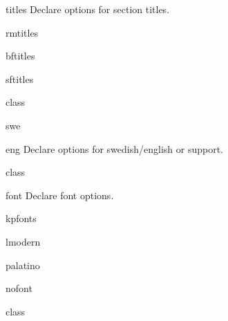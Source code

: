 \documentclass{skdoc}
\begin{document}
	\begin{option}{titles}
	Declare options for section titles.
	\begin{option}{rmtitles}
	\begin{option}{bftitles}
	\begin{option}{sftitles}
\begin{MacroCode}{class}
\newcommand*{\skrapport@SetupTitles}{\expandafter\@skrapport@SetupTitles\expandafter{\CurrentOption}}
\newcommand*{\@skrapport@SetupTitles}[1]{%
	\IfStrEq{#1}{bftitles}{%
		\setkeys{skrapport}{titles={bf}}%
	}{\IfStrEq{#1}{sftitles}{%
		\setkeys{skrapport}{titles={sf}}%
	}{
		\setkeys{skrapport}{titles={rm}}%
	}}}
\end{MacroCode}
	\end{option}
	\end{option}
	\end{option}
	\end{option}

	\begin{option}{swe}
	\begin{option}{eng}
	Declare options for swedish/english  or
	 support.
\begin{MacroCode}{class}
\end{MacroCode}
	\end{option}
	\end{option}

	\begin{option}{font}
	Declare font options.
	\begin{option}{kpfonts}
	\begin{option}{lmodern}
	\begin{option}{palatino}
	\begin{option}{nofont}
\begin{MacroCode}{class}
\newcommand*{\skrapport@SetupFont}{\expandafter\@skrapport@SetupFont\expandafter{\CurrentOption}}
\newcommand*{\@skrapport@SetupFont}[1]{\setkeys{skrapport}{font={#1}}}
\end{MacroCode}
	\end{option}
	\end{option}
	\end{option}
	\end{option}
	\end{option}
\end{document}
